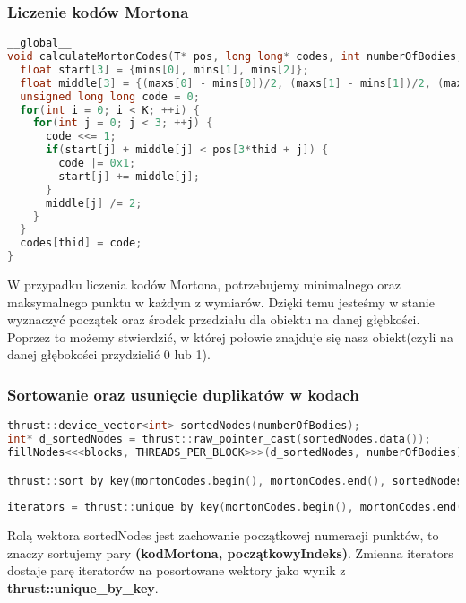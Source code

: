 \documentclass[14pt,twoside,a4paper]{article}
\theoremstyle{definition}
\begin{document}
\subsubsection{\large Liczenie kodów Mortona}
\begin{lstlisting}[language=C++, frame=single, framerule=2pt, caption=Krok 1]
__global__
void calculateMortonCodes(T* pos, long long* codes, int numberOfBodies, T* mins, T* maxs) {
  float start[3] = {mins[0], mins[1], mins[2]};
  float middle[3] = {(maxs[0] - mins[0])/2, (maxs[1] - mins[1])/2, (maxs[2] - mins[2])/2};
  unsigned long long code = 0;
  for(int i = 0; i < K; ++i) {
    for(int j = 0; j < 3; ++j) {
      code <<= 1;
      if(start[j] + middle[j] < pos[3*thid + j]) {
        code |= 0x1;
        start[j] += middle[j];
      }
      middle[j] /= 2;
    }
  }
  codes[thid] = code;
}
\end{lstlisting}
W przypadku liczenia kodów Mortona, potrzebujemy minimalnego oraz maksymalnego punktu w każdym z wymiarów. Dzięki temu jesteśmy w stanie wyznaczyć początek oraz środek przedziału dla obiektu na danej głębkości. Poprzez to możemy stwierdzić, w której połowie znajduje się nasz obiekt(czyli na danej głębokości przydzielić 0 lub 1).
\subsubsection{\large Sortowanie oraz usunięcie duplikatów w kodach}

\begin{lstlisting}[language=C++, frame=single, framerule=2pt, caption=Kroki 2-4]
thrust::device_vector<int> sortedNodes(numberOfBodies);
int* d_sortedNodes = thrust::raw_pointer_cast(sortedNodes.data());
fillNodes<<<blocks, THREADS_PER_BLOCK>>>(d_sortedNodes, numberOfBodies);

thrust::sort_by_key(mortonCodes.begin(), mortonCodes.end(), sortedNodes.begin());  
  
iterators = thrust::unique_by_key(mortonCodes.begin(), mortonCodes.end(), sortedNodes.begin());
\end{lstlisting}

Rolą wektora sortedNodes jest zachowanie początkowej numeracji punktów, to znaczy sortujemy pary \textbf{(kodMortona, początkowyIndeks)}.
Zmienna iterators dostaje parę iteratorów na posortowane wektory jako wynik z \textbf{thrust::unique\_by\_key}.
\end{document}
